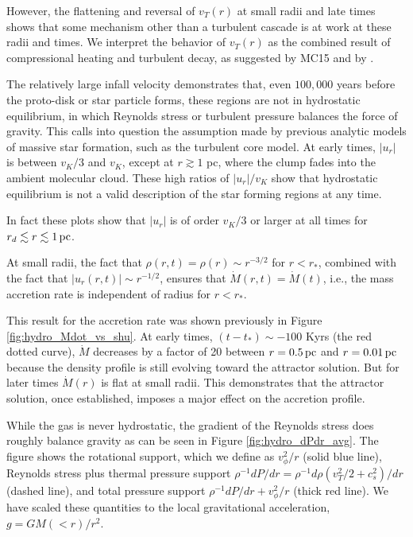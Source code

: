 \documentclass[../dissertation.tex]{subfiles}
\begin{document}
However, the flattening and reversal of $v_T(r)$ 
at small radii and late times shows that some mechanism other than a 
turbulent cascade is at work at these radii and times. We interpret the 
behavior of $v_T(r)$ as the combined result of compressional heating and 
turbulent decay, as suggested by MC15 and by \citet{2012ApJ...750L..31R}.  

The relatively large infall velocity demonstrates that, even $100,000$ years before 
the proto-disk or star particle forms, these regions 
are not in hydrostatic equilibrium, in which Reynolds stress or turbulent pressure balances the force of gravity.  This calls into question
the assumption made by previous analytic models of massive star formation, 
such as the turbulent core model.
%
At early times, $|u_r|$ is between $v_K/3$ and $v_K$, except 
at $r\gtrsim 1$ pc, where the clump fades into the ambient 
molecular cloud.  These high ratios of $|u_r|/v_K$ show that 
hydrostatic equilibrium is not a valid description of the star forming 
regions at any time. 

In fact these plots show that $|u_r|$ is of order $v_K/3$ or larger at all 
times for $r_d\lesssim r\lesssim 1\,\rm pc$.


At small radii, the fact that $\rho(r,t)=\rho(r)\sim r^{-3/2}$ for $r<r_*$, 
combined with the fact that $|u_r(r,t)|\sim r^{-1/2}$, ensures that 
$\dot M(r,t)=\dot M(t)$, i.e., the mass accretion rate is independent of 
radius for $r < r_*$. 

This result for the accretion rate was shown previously in Figure \ref{fig:hydro_Mdot_vs_shu}. At early times, $(t-t_*) \sim -100$ Kyrs (the red dotted curve),
$\dot{M}$ decreases by a factor of 20 between $r=0.5\,\rm pc$ and $r=0.01\,\rm pc$
because the density profile is still
evolving toward the attractor solution. But for later times $\dot M(r)$ 
is flat at small radii. This demonstrates that the attractor solution, once established, imposes a 
major effect on the accretion profile. 

While the gas is never hydrostatic, the gradient of the Reynolds
stress does roughly balance gravity as can be seen in Figure
\ref{fig:hydro_dPdr_avg}.  The figure shows the rotational support,
which we define as $v_{\phi}^2/r$ (solid blue line), Reynolds stress
plus thermal pressure support $\rho^{-1}dP/dr = \rho^{-1}d\rho
(v_T^2/2+c_s^2)/dr$ (dashed line), and total pressure support
$\rho^{-1}dP/dr + v_\phi^2/r$ (thick red line).  We have scaled these
quantities to the local gravitational acceleration, $g=GM(<r)/r^2$.
\end{document}

